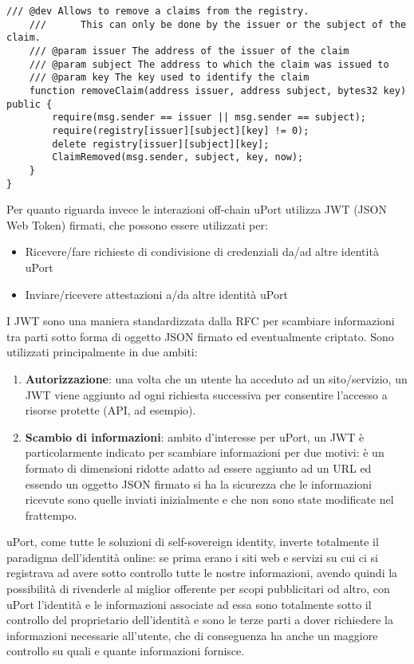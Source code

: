 \begin{itemize}
\begin{lstlisting}[language=Solidity]
    /// @dev Allows to remove a claims from the registry.
    ///      This can only be done by the issuer or the subject of the claim.
    /// @param issuer The address of the issuer of the claim
    /// @param subject The address to which the claim was issued to
    /// @param key The key used to identify the claim
    function removeClaim(address issuer, address subject, bytes32 key) public {
        require(msg.sender == issuer || msg.sender == subject);
        require(registry[issuer][subject][key] != 0);
        delete registry[issuer][subject][key];
        ClaimRemoved(msg.sender, subject, key, now);
    }
}
  \end{lstlisting}
\end{itemize}


Per quanto riguarda invece le interazioni off-chain uPort utilizza JWT (JSON Web Token)
firmati, che possono essere utilizzati per:
\begin{itemize}
  \item Ricevere/fare richieste di condivisione di credenziali da/ad altre identità uPort
  \item Inviare/ricevere attestazioni a/da altre identità uPort
\end{itemize}

I JWT sono una maniera standardizzata dalla RFC per scambiare informazioni
tra parti sotto forma di oggetto JSON firmato ed eventualmente criptato.
Sono utilizzati principalmente in due ambiti:
\begin{enumerate}
  \item \textbf{Autorizzazione}: una volta che un utente ha acceduto ad un sito/servizio,
  un JWT viene aggiunto ad ogni richiesta successiva per consentire
  l’accesso a risorse protette (API, ad esempio).
  \item \textbf{Scambio di informazioni}: ambito d’interesse per uPort,
  un JWT è particolarmente indicato per scambiare informazioni per due motivi:
  è un formato di dimensioni ridotte adatto ad essere aggiunto ad un URL
  ed essendo un oggetto JSON firmato si ha la sicurezza che le informazioni ricevute
  sono quelle inviati inizialmente e che non sono state modificate nel frattempo.
\end{enumerate}

uPort, come tutte le soluzioni di self-sovereign identity, inverte totalmente
il paradigma dell’identità online:
se prima erano i siti web e servizi su cui ci si registrava ad avere sotto controllo
tutte le nostre informazioni, avendo quindi la possibilità di rivenderle al miglior
offerente per scopi pubblicitari od altro, con uPort l’identità e le informazioni
associate ad essa sono totalmente sotto il controllo del proprietario dell’identità
e sono le terze parti a dover richiedere la informazioni necessarie all’utente,
che di conseguenza ha anche un maggiore controllo su quali e quante informazioni fornisce.

